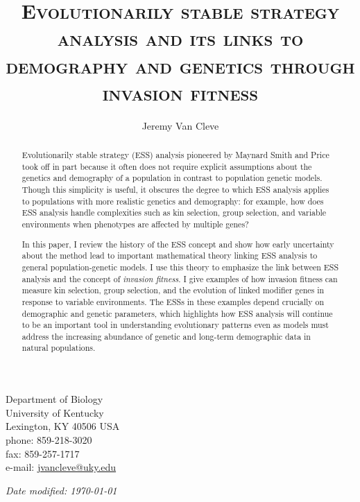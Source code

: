 \documentclass[11pt]{article}
\begin{document}
\begin{titlingpage}
\setlength{\droptitle}{2em}
\pretitle{\begin{center}\LARGE}
\posttitle{\par\end{center}\vskip 2.5em}

\title{\scshape Evolutionarily stable strategy analysis and its links to demography and genetics through invasion fitness}
\author{Jeremy Van Cleve}
\date{}
\maketitle

\vfill

\noindent
Department of Biology\\
University of Kentucky\\
Lexington, KY 40506 USA\\[1em]
phone: 859-218-3020\\
fax: 859-257-1717\\[1em]
e-mail: \href{mailto:jvancleve@uky.edu}{jvancleve@uky.edu}

\vspace{2em}

\begin{flushright} \textit{Date modified: \today} \end{flushright}
\end{titlingpage}

\linenumbers
\onehalfspacing
\begin{abstract}

  Evolutionarily stable strategy (ESS) analysis pioneered by Maynard Smith and Price took off in part because it often does not require explicit assumptions about the genetics and demography of a population in contrast to population genetic models. Though this simplicity is useful, it obscures the degree to which ESS analysis applies to populations with more realistic genetics and demography: for example, how does ESS analysis handle complexities such as kin selection, group selection, and variable environments when phenotypes are affected by multiple genes?

  In this paper, I review the history of the ESS concept and show how early uncertainty about the method lead to important mathematical theory linking ESS analysis to general population-genetic models. I use this theory to emphasize the link between ESS analysis and the concept of \textit{invasion fitness}. I give examples of how invasion fitness can measure kin selection, group selection, and the evolution of linked modifier genes in response to variable environments. The ESSs in these examples depend crucially on demographic and genetic parameters, which highlights how ESS analysis will continue to be an important tool in understanding evolutionary patterns even as models must address the increasing abundance of genetic and long-term demographic data in natural populations.

\end{abstract}
\end{document}
